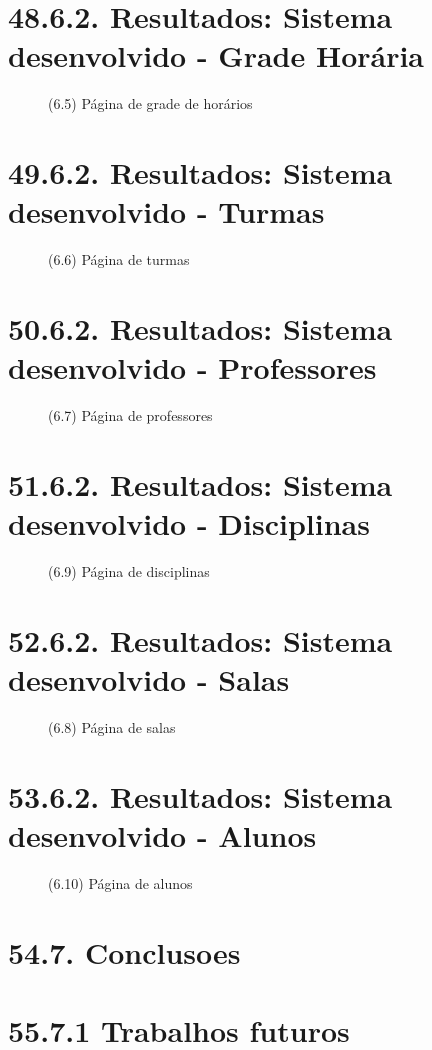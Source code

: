 \chapter*{48.6.2. Resultados: Sistema desenvolvido - Grade Horária}
\begin{figure}[htpb]\caption{(6.5) Página de grade de horários}\end{figure}
\chapter*{49.6.2. Resultados: Sistema desenvolvido - Turmas}
\begin{figure}[htpb]\caption{(6.6) Página de turmas}\end{figure}
\chapter*{50.6.2. Resultados: Sistema desenvolvido - Professores}
\begin{figure}[htpb]\caption{(6.7) Página de professores}\end{figure}
\chapter*{51.6.2. Resultados: Sistema desenvolvido - Disciplinas}
\begin{figure}[htpb]\caption{(6.9) Página de disciplinas}\end{figure}
\chapter*{52.6.2. Resultados: Sistema desenvolvido - Salas}
\begin{figure}[htpb]\caption{(6.8) Página de salas}\end{figure}
\chapter*{53.6.2. Resultados: Sistema desenvolvido - Alunos}
\begin{figure}[htpb]\caption{(6.10) Página de alunos}\end{figure}
\chapter{54.7. Conclusoes}
\chapter*{55.7.1 Trabalhos futuros}

